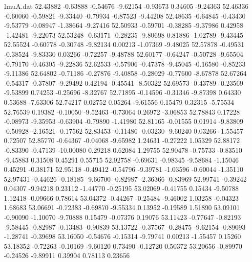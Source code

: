 \begin{filecontents}{ImuA.dat}
  52.43882   -0.63888   -0.54676   -9.62154   -0.93673    0.34605   -9.24363
  52.46336   -0.60060   -0.59821   -9.33440   -0.79934   -0.87523   -9.44208
  52.48635   -0.64845   -0.43430   -9.53779   -0.08947   -1.38664   -9.27416
  52.50933   -0.59701   -0.38285   -9.37986    0.42958   -1.42481   -9.22073
  52.53248   -0.63171   -0.28235   -9.80698    0.81886   -1.02789   -9.43445
  52.55524   -0.60778   -0.30748   -9.82134    0.00213   -1.07369   -9.48025
  52.57878   -0.49531   -0.38524   -9.83330    0.03266   -0.72257   -9.48788
  52.60177   -0.64247   -0.50728   -9.65504   -0.79170   -0.46305   -9.22836
  52.62533   -0.57906   -0.47378   -9.45045   -0.16580   -0.85233   -9.11386
  52.64802   -0.71186   -0.27876   -9.40858   -0.28029   -0.77600   -8.67878
  52.67264   -0.54317   -0.37807   -9.29492    0.42194   -0.45541   -8.50322
  52.69573   -0.43789   -0.23569   -9.53899    0.74253   -0.25696   -8.32767
  52.71895   -0.14596   -0.31346   -9.87398    0.64330    0.53688   -7.63306
  52.74217    0.02752    0.05264   -9.61556    0.15479    0.32315   -5.75534
  52.76539    0.19382   -0.10050   -9.52463   -0.73064    0.26972   -3.06853
  52.78843    0.17228   -0.08973   -9.35953   -0.63904   -0.79890   -1.41980
  52.81165   -0.01555    0.01914   -9.83809   -0.50928   -2.16521   -0.17562
  52.83453   -0.11486   -0.03230   -9.60240    0.03266   -1.55457    0.72507
  52.85770   -0.64367   -0.04068   -9.65982    1.24631   -0.27222    1.05329
  52.88172   -0.83390   -0.47139  -10.00080    0.29218    0.62084    1.29755
  52.90478   -0.75733   -0.83510   -9.45883    0.31508    0.45291    0.55715
  52.92758   -0.69631   -0.98345   -9.58684   -1.15046    0.45291   -0.38171
  52.95118   -0.49412   -0.54796   -9.39781   -1.03596   -0.60044   -1.35110
  52.97431   -0.44626   -0.18185   -9.66700   -0.82987   -2.36366   -0.83969
  52.99741   -0.39242    0.04307   -9.94218    0.23112   -1.44770   -0.25195
  53.02069   -0.41755    0.15434   -9.50788    1.12418   -0.09666    0.78614
  53.04372   -0.44267   -0.25484   -9.46002    1.03258   -0.04323    1.68683
  53.06691   -0.72383   -0.69870   -9.55334    0.13952   -0.19589    1.51890
  53.09101   -0.90090   -1.10070   -9.70888    0.15479   -0.07376    0.19076
  53.11423   -0.77647   -0.82193   -9.58445   -0.82987   -0.13483   -0.90839
  53.13722   -0.37567   -0.28475   -9.62154   -0.89093   -1.28741   -0.39698
  53.16050   -0.54676   -0.15314   -9.79741    0.00213   -1.55457    0.15260
  53.18352   -0.72263   -0.10169   -9.60120    0.73490   -0.12720    0.50372
  53.20656   -0.89970   -0.24526   -9.89911    0.39904    0.78113    0.23656

\end{filecontents}
